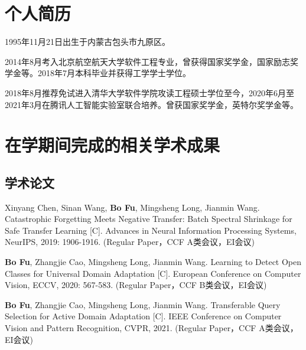 
\begin{resume}

  \section*{个人简历}

  1995年11月21日出生于内蒙古包头市九原区。

  2014年8月考入北京航空航天大学软件工程专业，曾获得国家奖学金，国家励志奖学金等。2018年7月本科毕业并获得工学学士学位。

  2018年8月推荐免试进入清华大学软件学院攻读工程硕士学位至今，2020年6月至2021年3月在腾讯人工智能实验室联合培养。曾获国家奖学金，英特尔奖学金等。


  \section*{在学期间完成的相关学术成果}

  \subsection*{学术论文}

  \begin{achievements}
    \item Xinyang Chen, Sinan Wang, \textbf{Bo Fu}, Mingsheng Long, Jianmin Wang. Catastrophic Forgetting Meets Negative Transfer: Batch Spectral Shrinkage for Safe Transfer Learning [C]. Advances in Neural Information Processing Systems, NeurIPS, 2019: 1906-1916. (Regular Paper，CCF A类会议，EI会议)
    \item \textbf{Bo Fu}, Zhangjie Cao, Mingsheng Long, Jianmin Wang. Learning to Detect Open Classes for Universal Domain Adaptation [C]. European Conference on Computer Vision, ECCV, 2020: 567-583.  (Regular Paper，CCF B类会议，EI会议)
    \item \textbf{Bo Fu}, Zhangjie Cao, Mingsheng Long, Jianmin Wang. Transferable Query Selection for Active Domain Adaptation [C]. IEEE Conference on Computer Vision and Pattern Recognition, CVPR, 2021.  (Regular Paper，CCF A类会议，EI会议)
  \end{achievements}



\end{resume}
